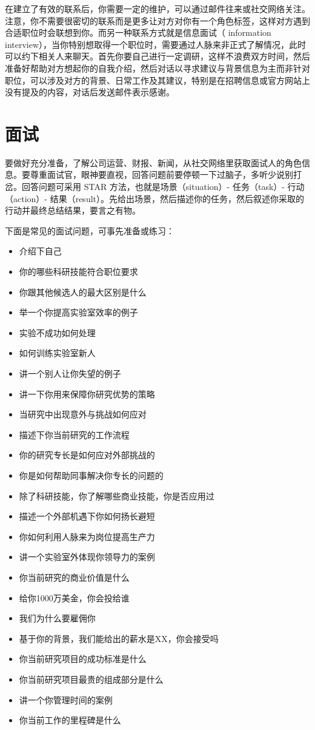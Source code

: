 \documentclass[]{tufte-book}
\providecommand{\tightlist}{%
  \setlength{\itemsep}{0pt}\setlength{\parskip}{0pt}}
\begin{document}
在建立了有效的联系后，你需要一定的维护，可以通过邮件往来或社交网络关注。注意，你不需要很密切的联系而是更多让对方对你有一个角色标签，这样对方遇到合适职位时会联想到你。而另一种联系方式就是信息面试（ information interview），当你特别想取得一个职位时，需要通过人脉来非正式了解情况，此时可以约下相关人来聊天。首先你要自己进行一定调研，这样不浪费双方时间，然后准备好帮助对方想起你的自我介绍，然后对话以寻求建议与背景信息为主而非针对职位，可以涉及对方的背景、日常工作及其建议，特别是在招聘信息或官方网站上没有提及的内容，对话后发送邮件表示感谢。

\hypertarget{ux9762ux8bd5}{%
\section{面试}\label{ux9762ux8bd5}}

要做好充分准备，了解公司运营、财报、新闻，从社交网络里获取面试人的角色信息。要尊重面试官，眼神要直视，回答问题前要停顿一下过脑子，多听少说别打岔。回答问题可采用 STAR 方法，也就是场景（situation）- 任务（task）- 行动（action）- 结果（result）。先给出场景，然后描述你的任务，然后叙述你采取的行动并最终总结结果，要言之有物。

下面是常见的面试问题，可事先准备或练习：

\begin{itemize}
\tightlist
\item
  介绍下自己
\item
  你的哪些科研技能符合职位要求
\item
  你跟其他候选人的最大区别是什么
\item
  举一个你提高实验室效率的例子
\item
  实验不成功如何处理
\item
  如何训练实验室新人
\item
  讲一个别人让你失望的例子
\item
  讲一下你用来保障你研究优势的策略
\item
  当研究中出现意外与挑战如何应对
\item
  描述下你当前研究的工作流程
\item
  你的研究专长是如何应对外部挑战的
\item
  你是如何帮助同事解决你专长的问题的
\item
  除了科研技能，你了解哪些商业技能，你是否应用过
\item
  描述一个外部机遇下你如何扬长避短
\item
  你如何利用人脉来为岗位提高生产力
\item
  讲一个实验室外体现你领导力的案例
\item
  你当前研究的商业价值是什么
\item
  给你1000万美金，你会投给谁
\item
  我们为什么要雇佣你
\item
  基于你的背景，我们能给出的薪水是XX，你会接受吗
\item
  你当前研究项目的成功标准是什么
\item
  你当前研究项目最贵的组成部分是什么
\item
  讲一个你管理时间的案例
\item
  你当前工作的里程碑是什么
\end{itemize}
\end{document}
